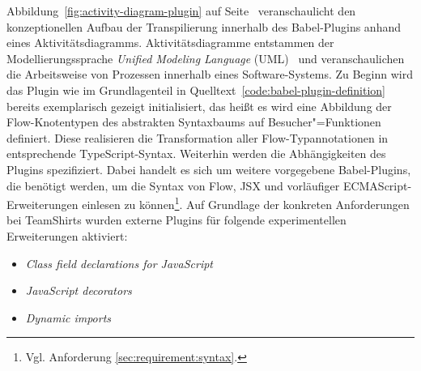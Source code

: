 Abbildung~\ref{fig:activity-diagram-plugin} auf Seite~\pageref{fig:activity-diagram-plugin} veranschaulicht den konzeptionellen Aufbau der Transpilierung innerhalb des Babel-Plugins anhand eines Aktivitätsdiagramms. Aktivitätsdiagramme entstammen der Modellierungssprache \textit{Unified Modeling Language} (UML)~\autocite{OMG:UML} und veranschaulichen die Arbeitsweise von Prozessen innerhalb eines Software-Systems. Zu Beginn wird das Plugin wie im Grundlagenteil in Quelltext~\ref{code:babel-plugin-definition} bereits exemplarisch gezeigt initialisiert, das heißt es wird eine Abbildung der Flow-Knotentypen des abstrakten Syntaxbaums auf Besucher"=Funktionen definiert. Diese realisieren die Transformation aller Flow-Typannotationen in entsprechende TypeScript-Syntax.
Weiterhin werden die Abhängigkeiten des Plugins spezifiziert. Dabei handelt es sich um weitere vorgegebene Babel-Plugins, die benötigt werden, um die Syntax von Flow, JSX und vorläufiger ECMAScript-Erweiterungen einlesen zu können\footnote{Vgl. Anforderung \ref{sec:requirement:syntax}.}. Auf Grundlage der konkreten Anforderungen bei TeamShirts wurden externe Plugins für folgende experimentellen Erweiterungen aktiviert:

\begin{itemize}
  \item \textit{Class field declarations for JavaScript}~\autocite{ES_PROPOSAL:CLASS_FIELDS}
  \item \textit{JavaScript decorators}~\autocite{ES_PROPOSAL:DECORATORS}
  \item \textit{Dynamic imports}~\autocite{ES_PROPOSAL:DYNAMIC_IMPORTS}
\end{itemize}

